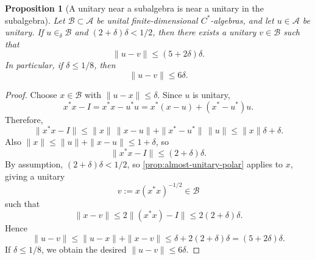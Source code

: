 \documentclass[11pt,reqno]{amsart}
\newtheorem{proposition}[theorem]{Proposition}
\theoremstyle{definition}
\theoremstyle{remark}
\numberwithin{equation}{section}
\newcommand{\cA}{\mathcal A}
\newcommand{\cB}{\mathcal B}
\begin{document}
\begin{proposition}[A unitary near a subalgebra is near a unitary in the subalgebra]
\label{prop:unitary-near-subalgebra}
Let $\cB \subset \cA$ be unital finite-dimensional $C^*$-algebras, and let $u \in \cA$ be unitary. If $u \in_\delta \cB$ and $(2+\delta)\delta < 1/2$, then there exists a unitary $v \in \cB$ such that
\[
\|u-v\| \le (5+2\delta)\delta.
\]
In particular, if $\delta \le 1/8$, then
\[
\|u-v\| \le 6\delta.
\]
\end{proposition}

\begin{proof}
Choose $x \in \cB$ with $\|u-x\|\le \delta$. Since $u$ is unitary,
\[
x^*x-I = x^*x-u^*u = x^*(x-u)+(x^*-u^*)u.
\]
Therefore,
\[
\|x^*x-I\|
\le
\|x\|\,\|x-u\|+\|x^*-u^*\|\,\|u\|
\le
\|x\|\delta+\delta.
\]
Also $\|x\| \le \|u\|+\|x-u\| \le 1+\delta$, so
\[
\|x^*x-I\| \le (2+\delta)\delta.
\]
By assumption, $(2+\delta)\delta<1/2$, so \cref{prop:almost-unitary-polar}
applies to $x$, giving a unitary
\[
v := x(x^*x)^{-1/2} \in \cB
\]
such that
\[
\|x-v\| \le 2\|(x^*x)-I\| \le 2(2+\delta)\delta.
\]
Hence
\[
\|u-v\| \le \|u-x\|+\|x-v\|
\le
\delta + 2(2+\delta)\delta
=
(5+2\delta)\delta.
\]
If $\delta \le 1/8$, we obtain the desired $\|u-v\| \le 6\delta.$
\end{proof}



\end{document}
